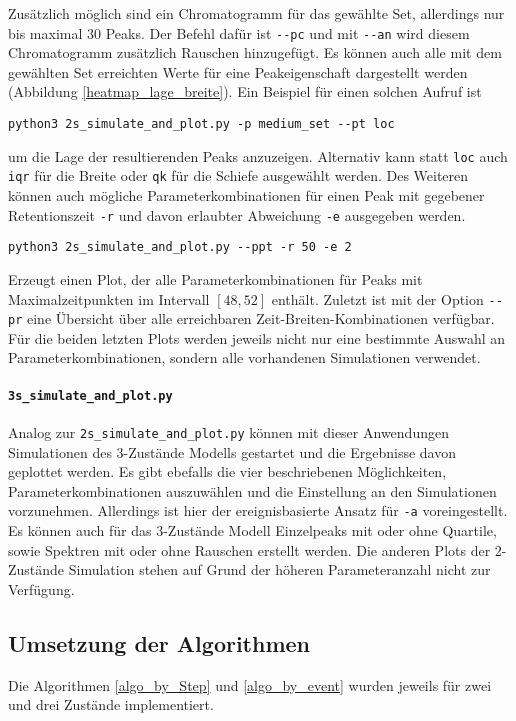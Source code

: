 Zusätzlich möglich sind ein Chromatogramm für das gewählte Set, allerdings nur bis maximal 30 Peaks. Der Befehl dafür ist \verb!--pc! und mit \verb!--an! wird diesem Chromatogramm zusätzlich Rauschen hinzugefügt.
Es können auch alle mit dem gewählten Set erreichten Werte für eine Peakeigenschaft dargestellt werden (Abbildung \ref{heatmap_lage_breite}). Ein Beispiel für einen solchen Aufruf ist
\begin{verbatim}
python3 2s_simulate_and_plot.py -p medium_set --pt loc
\end{verbatim}
um die Lage der resultierenden Peaks anzuzeigen. Alternativ kann statt \texttt{loc} auch \texttt{iqr} für die Breite oder \texttt{qk} für die Schiefe ausgewählt werden. Des Weiteren können auch mögliche Parameterkombinationen für einen Peak mit gegebener Retentionszeit \texttt{-r} und davon erlaubter Abweichung \texttt{-e} ausgegeben werden.
\begin{verbatim}
python3 2s_simulate_and_plot.py --ppt -r 50 -e 2
\end{verbatim}
Erzeugt einen Plot, der alle Parameterkombinationen für Peaks mit Maximalzeitpunkten im Intervall $[48, 52]$ enthält.
Zuletzt ist mit der Option \verb!--pr! eine Übersicht über alle erreichbaren Zeit-Breiten-Kombinationen verfügbar.
Für die beiden letzten Plots werden jeweils nicht nur eine bestimmte Auswahl an Parameterkombinationen, sondern alle vorhandenen Simulationen verwendet.


\paragraph{\texttt{3s\_simulate\_and\_plot.py}}
Analog zur \texttt{2s\_simulate\_and\_plot.py} können mit dieser Anwendungen Simulationen des 3-Zustände Modells gestartet und die Ergebnisse davon geplottet werden. Es gibt ebefalls die vier beschriebenen Möglichkeiten, Parameterkombinationen auszuwählen und die Einstellung an den Simulationen vorzunehmen. Allerdings ist hier der ereignisbasierte Ansatz für \texttt{-a} voreingestellt.
Es können auch für das 3-Zustände Modell Einzelpeaks mit oder ohne Quartile, sowie Spektren mit oder ohne Rauschen erstellt werden. Die anderen Plots der 2-Zustände Simulation stehen auf Grund der höheren Parameteranzahl nicht zur Verfügung.



\subsection{Umsetzung der Algorithmen}
Die Algorithmen \ref{algo_by_Step} und \ref{algo_by_event} wurden jeweils für zwei und drei Zustände implementiert. 
 
